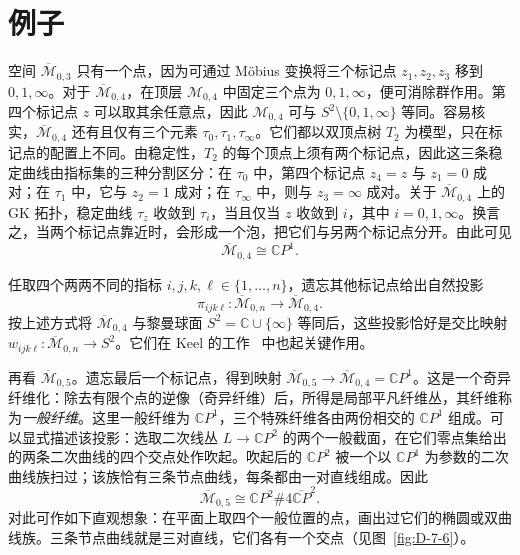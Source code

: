 
\section{例子}\label{sec:D-7}

空间 $\overline{\mathcal M}_{0,3}$ 只有一个点，因为可通过 Möbius 变换将三个标记点 $z_1,z_2,z_3$ 移到 $0,1,\infty$。对于 $\overline{\mathcal M}_{0,4}$，在顶层 $\mathcal M_{0,4}$ 中固定三个点为 $0,1,\infty$，便可消除群作用。第四个标记点 $z$ 可以取其余任意点，因此 $\mathcal M_{0,4}$ 可与 $S^2\setminus\{0,1,\infty\}$ 等同。容易核实，$\overline{\mathcal M}_{0,4}$ 还有且仅有三个元素 $\tau_0,\tau_1,\tau_\infty$。它们都以双顶点树 $T_2$ 为模型，只在标记点的配置上不同。由稳定性，$T_2$ 的每个顶点上须有两个标记点，因此这三条稳定曲线由指标集的三种分割区分：在 $\tau_0$ 中，第四个标记点 $z_4=z$ 与 $z_1=0$ 成对；在 $\tau_1$ 中，它与 $z_2=1$ 成对；在 $\tau_\infty$ 中，则与 $z_3=\infty$ 成对。关于 $\overline{\mathcal M}_{0,4}$ 上的 GK 拓扑，稳定曲线 $\tau_z$ 收敛到 $\tau_i$，当且仅当 $z$ 收敛到 $i$，其中 $i=0,1,\infty$。换言之，当两个标记点靠近时，会形成一个泡，把它们与另两个标记点分开。由此可见
\[
  \overline{\mathcal M}_{0,4}\cong\mathbb CP^1.
\]

任取四个两两不同的指标 $i,j,k,\ell\in\{1,\ldots,n\}$，遗忘其他标记点给出自然投影
\[
  \pi_{ijk\ell}:\overline{\mathcal M}_{0,n}\longrightarrow
     \overline{\mathcal M}_{0,4}.
\]
按上述方式将 $\overline{\mathcal M}_{0,4}$ 与黎曼球面 $S^2=\mathbb C\cup\{\infty\}$ 等同后，这些投影恰好是交比映射 $w_{ijk\ell}:\overline{\mathcal M}_{0,n}\to S^2$。它们在 Keel 的工作~ 中也起关键作用。

再看 $\overline{\mathcal M}_{0,5}$。遗忘最后一个标记点，得到映射 $\overline{\mathcal M}_{0,5}\to\overline{\mathcal M}_{0,4}=\mathbb CP^1$。这是一个奇异纤维化：除去有限个点的逆像（奇异纤维）后，所得是局部平凡纤维丛，其纤维称为\emph{一般纤维}。这里一般纤维为 $\mathbb CP^1$，三个特殊纤维各由两份相交的 $\mathbb CP^1$ 组成。可以显式描述该投影：选取二次线丛 $L\to\mathbb CP^2$ 的两个一般截面，在它们零点集给出的两条二次曲线的四个交点处作吹起。吹起后的 $\mathbb CP^2$ 被一个以 $\mathbb CP^1$ 为参数的二次曲线族扫过；该族恰有三条节点曲线，每条都由一对直线组成。因此
\[
  \overline{\mathcal M}_{0,5}\cong\mathbb CP^2\#4\overline{\mathbb CP}^{2}.
\]
对此可作如下直观想象：在平面上取四个一般位置的点，画出过它们的椭圆或双曲线族。三条节点曲线就是三对直线，它们各有一个交点（见图~\ref{fig:D-7-6}）。

